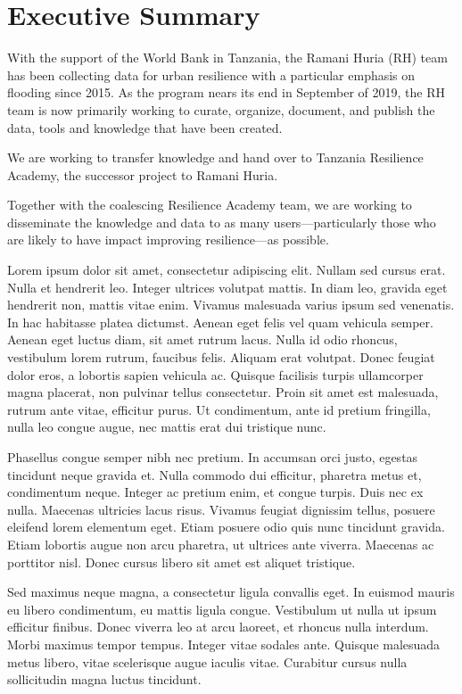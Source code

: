 \documentclass[a4paper,12pt,twoside]{article}
\begin{document}
\section{Executive Summary}
\label{executivesummary}
\begin{multicols}{2}
With the support of the World Bank in Tanzania, the Ramani Huria (RH) team has been collecting data for urban resilience with a particular emphasis on flooding since 2015. As the program nears its end in September of 2019, the RH team is now primarily working to curate, organize, document, and publish the data, tools and knowledge that have been created. 

We are working to transfer knowledge and hand over to Tanzania Resilience Academy, the successor project to Ramani Huria. 

Together with the coalescing Resilience Academy team, we are working to disseminate the knowledge and data to as many users---particularly those who are likely to have impact improving resilience---as possible. 

Lorem ipsum dolor sit amet, consectetur adipiscing elit. Nullam sed cursus erat. Nulla et hendrerit leo. Integer ultrices volutpat mattis. In diam leo, gravida eget hendrerit non, mattis vitae enim. Vivamus malesuada varius ipsum sed venenatis. In hac habitasse platea dictumst. Aenean eget felis vel quam vehicula semper. Aenean eget luctus diam, sit amet rutrum lacus. Nulla id odio rhoncus, vestibulum lorem rutrum, faucibus felis. Aliquam erat volutpat. Donec feugiat dolor eros, a lobortis sapien vehicula ac. Quisque facilisis turpis ullamcorper magna placerat, non pulvinar tellus consectetur. Proin sit amet est malesuada, rutrum ante vitae, efficitur purus. Ut condimentum, ante id pretium fringilla, nulla leo congue augue, nec mattis erat dui tristique nunc.

Phasellus congue semper nibh nec pretium. In accumsan orci justo, egestas tincidunt neque gravida et. Nulla commodo dui efficitur, pharetra metus et, condimentum neque. Integer ac pretium enim, et congue turpis. Duis nec ex nulla. Maecenas ultricies lacus risus. Vivamus feugiat dignissim tellus, posuere eleifend lorem elementum eget. Etiam posuere odio quis nunc tincidunt gravida. Etiam lobortis augue non arcu pharetra, ut ultrices ante viverra. Maecenas ac porttitor nisl. Donec cursus libero sit amet est aliquet tristique.

Sed maximus neque magna, a consectetur ligula convallis eget. In euismod mauris eu libero condimentum, eu mattis ligula congue. Vestibulum ut nulla ut ipsum efficitur finibus. Donec viverra leo at arcu laoreet, et rhoncus nulla interdum. Morbi maximus tempor tempus. Integer vitae sodales ante. Quisque malesuada metus libero, vitae scelerisque augue iaculis vitae. Curabitur cursus nulla sollicitudin magna luctus tincidunt.


\end{multicols}
\end{document}
